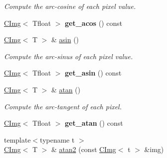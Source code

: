 \begin{DoxyCompactItemize}
\begin{DoxyCompactList}\small\item\em Compute the arc-\/cosine of each pixel value. \item\end{DoxyCompactList}\item 
\hypertarget{structcimg__library_1_1CImg_a80972e1b6fd55bf970cbb07d56c39335}{
\hyperlink{structcimg__library_1_1CImg}{CImg}$<$ Tfloat $>$ {\bfseries get\_\-acos} () const }
\label{structcimg__library_1_1CImg_a80972e1b6fd55bf970cbb07d56c39335}

\item 
\hypertarget{structcimg__library_1_1CImg_ac23ecd49999eedf62c9142fe1559bdd6}{
\hyperlink{structcimg__library_1_1CImg}{CImg}$<$ T $>$ \& \hyperlink{structcimg__library_1_1CImg_ac23ecd49999eedf62c9142fe1559bdd6}{asin} ()}
\label{structcimg__library_1_1CImg_ac23ecd49999eedf62c9142fe1559bdd6}

\begin{DoxyCompactList}\small\item\em Compute the arc-\/sinus of each pixel value. \item\end{DoxyCompactList}\item 
\hypertarget{structcimg__library_1_1CImg_a4ff91920cd29bdfe6c8a04c9fb9a5f45}{
\hyperlink{structcimg__library_1_1CImg}{CImg}$<$ Tfloat $>$ {\bfseries get\_\-asin} () const }
\label{structcimg__library_1_1CImg_a4ff91920cd29bdfe6c8a04c9fb9a5f45}

\item 
\hypertarget{structcimg__library_1_1CImg_a1de850b33bf304ba192bd84b7197426d}{
\hyperlink{structcimg__library_1_1CImg}{CImg}$<$ T $>$ \& \hyperlink{structcimg__library_1_1CImg_a1de850b33bf304ba192bd84b7197426d}{atan} ()}
\label{structcimg__library_1_1CImg_a1de850b33bf304ba192bd84b7197426d}

\begin{DoxyCompactList}\small\item\em Compute the arc-\/tangent of each pixel. \item\end{DoxyCompactList}\item 
\hypertarget{structcimg__library_1_1CImg_ae34fafc7bd6868ac7dcfbe2d8e9bf3b4}{
\hyperlink{structcimg__library_1_1CImg}{CImg}$<$ Tfloat $>$ {\bfseries get\_\-atan} () const }
\label{structcimg__library_1_1CImg_ae34fafc7bd6868ac7dcfbe2d8e9bf3b4}

\item 
\hypertarget{structcimg__library_1_1CImg_a28a02254ebecc0038790bb51607be4f4}{
{\footnotesize template$<$typename t $>$ }\\\hyperlink{structcimg__library_1_1CImg}{CImg}$<$ T $>$ \& \hyperlink{structcimg__library_1_1CImg_a28a02254ebecc0038790bb51607be4f4}{atan2} (const \hyperlink{structcimg__library_1_1CImg}{CImg}$<$ t $>$ \&img)}
\label{structcimg__library_1_1CImg_a28a02254ebecc0038790bb51607be4f4}


\end{DoxyCompactItemize}
